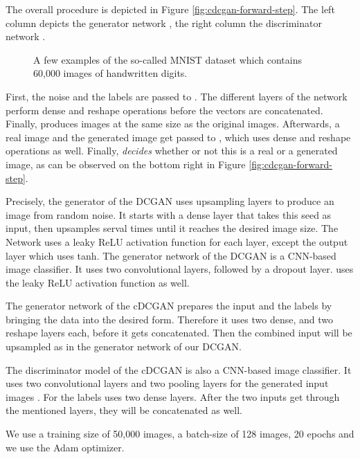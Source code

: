 \documentclass[journal]{IEEEtran}
\begin{document}
{{The overall procedure is depicted in Figure \ref{fig:cdcgan-forward-step}. The left column depicts the generator network , the right column the discriminator network .

\begin{figure}[htp]
	\centering
	\caption{
		A few examples of the so-called MNIST dataset which contains 60,000 images of handwritten digits.
	}
	\label{fig:mnist-example}
\end{figure}

First, the noise and the labels are passed to . The different layers of the network perform dense and reshape operations before the vectors are concatenated. Finally,   produces images at the same size as the original images. Afterwards, a real image and the generated image get passed to , which uses dense and reshape operations as well. Finally,  \textit{decides} whether or not this is a real or a generated image, as can be observed on the bottom right in Figure \ref{fig:cdcgan-forward-step}. 

Precisely, the generator of the DCGAN uses upsampling layers to produce an image from random noise. It starts with a dense layer that takes this seed as input, then  upsamples serval times until it reaches the desired image size. The Network uses a leaky ReLU activation function for each layer, except the output layer which uses tanh. The generator network of the DCGAN is a CNN-based image classifier. It uses two convolutional layers, followed by a dropout layer.  uses the leaky ReLU activation function as well. 

The generator network of the cDCGAN prepares the input and the labels by bringing the data into the desired form. Therefore it uses two dense, and two reshape layers each, before it gets concatenated. Then the combined input will be upsampled as in the generator network of our DCGAN.

The discriminator model of the cDCGAN is also a CNN-based image classifier. It uses two convolutional layers and two pooling layers for the generated input images . For the labels  uses two dense layers. After the two inputs get through the mentioned layers, they will be concatenated as well. 

We use a training size of 50,000 images, a batch-size of 128 images, 20 epochs and we use the Adam optimizer.


}}
\end{document}
